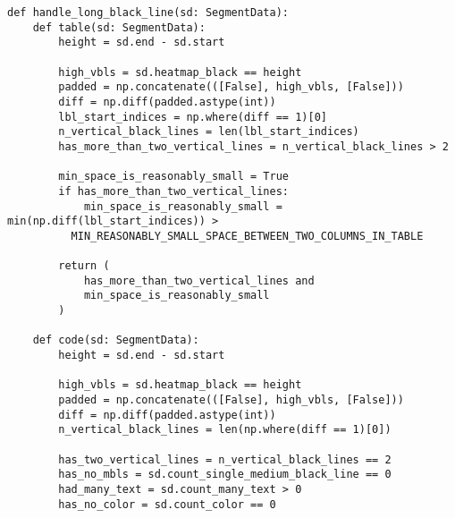 \newpage

\begin{lstlisting}[caption={Функция handle\_long\_black\_line (часть 1)}, label={lst:hlbl}]
def handle_long_black_line(sd: SegmentData):
    def table(sd: SegmentData):
        height = sd.end - sd.start

        high_vbls = sd.heatmap_black == height
        padded = np.concatenate(([False], high_vbls, [False]))
        diff = np.diff(padded.astype(int))
        lbl_start_indices = np.where(diff == 1)[0]
        n_vertical_black_lines = len(lbl_start_indices)
        has_more_than_two_vertical_lines = n_vertical_black_lines > 2

        min_space_is_reasonably_small = True
        if has_more_than_two_vertical_lines:
            min_space_is_reasonably_small = min(np.diff(lbl_start_indices)) >
          MIN_REASONABLY_SMALL_SPACE_BETWEEN_TWO_COLUMNS_IN_TABLE

        return (
            has_more_than_two_vertical_lines and
            min_space_is_reasonably_small
        )

    def code(sd: SegmentData):
        height = sd.end - sd.start

        high_vbls = sd.heatmap_black == height
        padded = np.concatenate(([False], high_vbls, [False]))
        diff = np.diff(padded.astype(int))
        n_vertical_black_lines = len(np.where(diff == 1)[0])

        has_two_vertical_lines = n_vertical_black_lines == 2
        has_no_mbls = sd.count_single_medium_black_line == 0
        had_many_text = sd.count_many_text > 0
        has_no_color = sd.count_color == 0
\end{lstlisting}

\newpage

